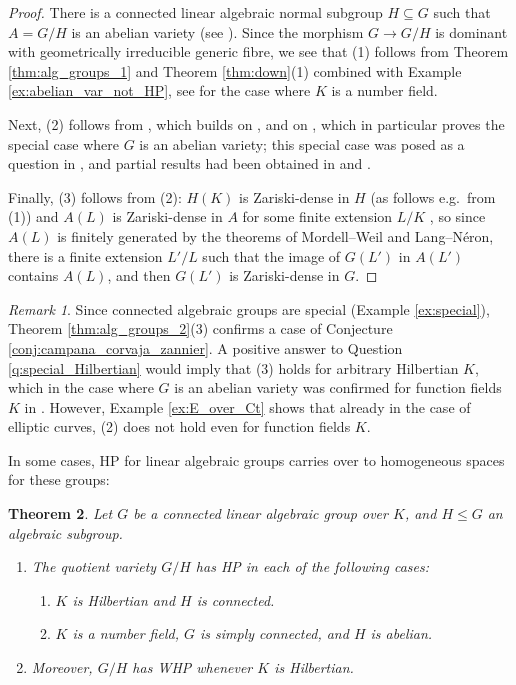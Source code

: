\documentclass[10pt,a4paper]{amsart}
\theoremstyle{plain}
\newtheorem{theorem}{Theorem}
\theoremstyle{remark}
\newtheorem{remark}[theorem]{Remark}
\numberwithin{theorem}{section}
\begin{document}
\begin{proof}
There is a connected linear algebraic normal subgroup $H\subseteq G$ such that $A=G/H$ is an abelian variety (see \cite[Thm.~1.1]{Conrad}). 
Since the morphism $G\to G/H$ is dominant with geometrically irreducible generic fibre,  we see that  (1) follows from Theorem \ref{thm:alg_groups_1} and Theorem \ref{thm:down}(1) combined with Example \ref{ex:abelian_var_not_HP}, see \cite[Corollary 4.7]{BFP} for the case where $K$ is a number field.    

Next, (2) follows from  \cite[Theorem 1.6]{Luger2}, 
which builds
on \cite{Liu},
and on \cite{CDJLZ},
which in particular proves the special case where $G$ is an abelian variety;
this special case was posed as a question in \cite{CZ}, and partial results had been obtained in 
\cite{Zannier} and \cite{Javanpeykar}.
 
Finally, (3) follows from (2): 
$H(K)$ is Zariski-dense in $H$ (as follows e.g.~from (1))
and $A(L)$ is Zariski-dense in $A$ for some finite extension $L/K$ \cite{FreyJarden},
so since $A(L)$ is finitely generated by the theorems 
 of Mordell--Weil and Lang--N\'eron, there is a finite extension $L'/L$ such that the image of $G(L')$ in $A(L')$ contains $A(L)$,
 and then $G(L')$ is Zariski-dense in $G$.
\end{proof}

\begin{remark}
Since connected algebraic groups are special (Example \ref{ex:special}), 
Theorem \ref{thm:alg_groups_2}(3) confirms a case of
Conjecture \ref{conj:campana_corvaja_zannier}.
A positive answer to Question \ref{q:special_Hilbertian}
would imply that (3) holds for arbitrary Hilbertian $K$,
which in the case where $G$ is an abelian variety was confirmed for function fields $K$ in \cite[Theorem A]{Jav25}.
However, Example \ref{ex:E_over_Ct}
shows that already in the case of elliptic curves,
(2) does not hold even for function fields $K$. 
\end{remark}

In some cases, HP for linear algebraic groups carries over to homogeneous spaces for these groups:

\begin{theorem} \label{thm:homogeneous}
Let $G$ be a connected linear algebraic group over $K$,
and $H\leq G$ an algebraic subgroup.
\begin{enumerate}
\item The quotient variety $G/H$ has HP in each of the following cases:
\begin{enumerate}
\item $K$ is Hilbertian and $H$ is connected.    
\item $K$ is a number field, $G$ is simply connected, and $H$ is abelian.
\end{enumerate}
\item Moreover, $G/H$ has WHP whenever $K$ is Hilbertian.
\end{enumerate}
\end{theorem}
\end{document}
